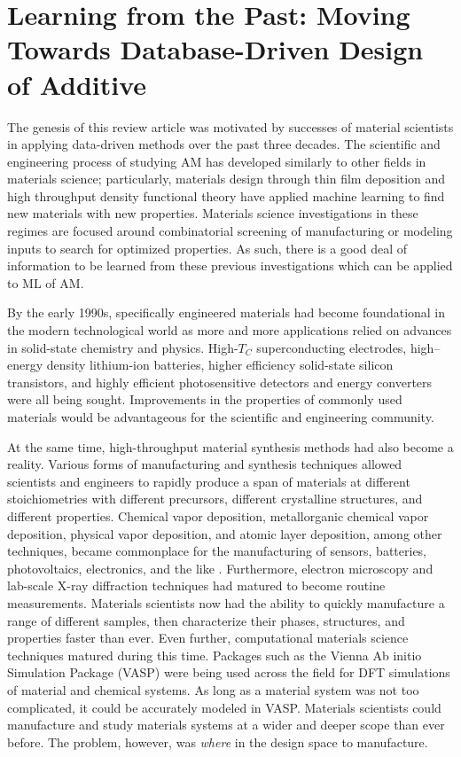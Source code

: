 \section{Learning from the Past: Moving Towards Database-Driven Design of Additive}
The genesis of this review article was motivated by successes of material scientists in applying data-driven methods over the past three decades. The scientific and engineering process of studying AM has developed similarly to other fields in materials science; particularly, materials design through thin film deposition and high throughput density functional theory have applied machine learning to find new materials with new properties. Materials science investigations in these regimes are focused around combinatorial screening of manufacturing or modeling inputs to search for optimized properties. As such, there is a good deal of information to be learned from these previous investigations which can be applied to ML of AM. 

By the early 1990s, specifically engineered materials had become foundational in the modern technological world as more and more applications relied on advances in solid-state chemistry and physics. High-$T_C$ superconducting electrodes, high--energy density lithium-ion batteries, higher efficiency solid-state silicon transistors, and highly efficient photosensitive detectors and energy converters were all being sought. Improvements in the properties of commonly used materials would be advantageous for the scientific and engineering community.

At the same time, high-throughput material synthesis methods had also become a reality. Various forms of manufacturing and synthesis techniques allowed scientists and engineers to rapidly produce a span of materials at different stoichiometries with different precursors, different crystalline structures, and different properties. Chemical vapor deposition, metallorganic chemical vapor deposition, physical vapor deposition, and atomic layer deposition, among other techniques, became commonplace for the manufacturing of sensors, batteries, photovoltaics, electronics, and the like \cite{Hampden-Smith1995, Gilmer1998, Mercey1999, Mitzi2001}. Furthermore, electron microscopy and lab-scale X-ray diffraction techniques had matured to become routine measurements. Materials scientists now had the ability to quickly manufacture a range of different samples, then characterize their phases, structures, and properties faster than ever. Even further, computational materials science techniques matured during this time. Packages such as the Vienna Ab initio Simulation Package (VASP) were being used across the field for DFT simulations of material and chemical systems. As long as a material system was not too complicated, it could be accurately modeled in VASP. Materials scientists could manufacture and study materials systems at a wider and deeper scope than ever before. The problem, however, was \textit{where} in the design space to manufacture.

